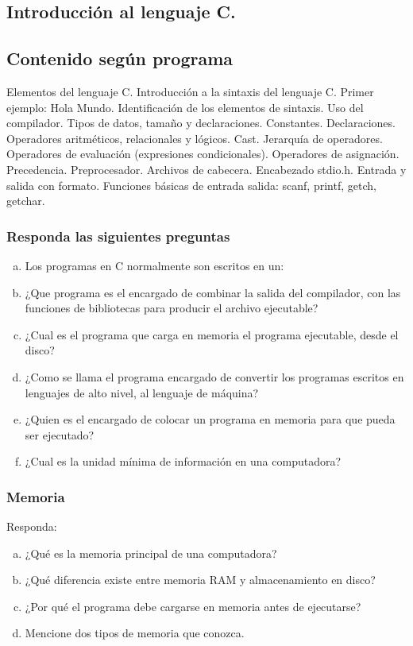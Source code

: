\setcounter{subsection}{3}
\subsection*{Introducción al lenguaje C.}

\subsection*{Contenido según programa}
Elementos del lenguaje C. Introducción a la sintaxis del lenguaje C.  Primer ejemplo: Hola Mundo. Identificación de los elementos de sintaxis. Uso del compilador. Tipos de datos, tamaño y declaraciones. Constantes. Declaraciones.  Operadores aritméticos, relacionales y lógicos. Cast. Jerarquía de operadores.  Operadores de evaluación (expresiones condicionales). Operadores de asignación.  Precedencia. Preprocesador. Archivos de cabecera. Encabezado stdio.h. Entrada y salida con formato. Funciones básicas de entrada salida: scanf, printf, getch, getchar.

\begin{ejercicioClase}
    \subsubsection{Responda las siguientes preguntas}
    \begin{enumerate}[a)]
      \item Los programas en C normalmente son escritos en un:
      \item ¿Que programa es el encargado de combinar la salida del compilador, con las funciones de bibliotecas para producir el archivo ejecutable?
      \item ¿Cual es el programa que carga en memoria el programa ejecutable, desde el disco?
      \item ¿Como se llama el programa encargado de convertir los programas escritos en lenguajes de alto nivel, al lenguaje 
        de máquina?
      \item ¿Quien es el encargado de colocar un programa en memoria para que pueda ser ejecutado?
      \item ¿Cual es la unidad mínima de información en una computadora?
    \end{enumerate}


    \subsubsection{Memoria}
    Responda:
    \begin{enumerate}[a)]
      \item ¿Qué es la memoria principal de una computadora?
      \item ¿Qué diferencia existe entre memoria RAM y almacenamiento en disco?
      \item ¿Por qué el programa debe cargarse en memoria antes de ejecutarse?
      \item Mencione dos tipos de memoria que conozca.
    \end{enumerate}

\end{ejercicioClase}

